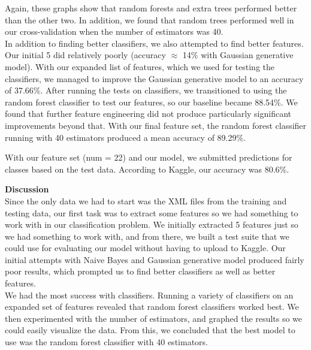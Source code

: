 \documentclass[12pt]{article}
\begin{document}
Again, these graphs show that random forests and extra trees performed better than the other two. In addition, we found that random trees performed well in our cross-validation when the number of estimators was 40. \\

In addition to finding better classifiers, we also attempted to find better features. Our initial 5 did relatively poorly (accuracy $\approx$ 14\% with Gaussian generative model). With our expanded list of features, which we used for testing the classifiers, we managed to improve the Gaussian generative model to an accuracy of 37.66\%. After running the tests on classifiers, we transitioned to using the random forest classifier to test our features, so our baseline became 88.54\%. We found that further feature engineering did not produce particularly significant improvements beyond that. With our final feature set, the random forest classifier running with 40 estimators produced a mean accuracy of 89.29\%. 

With our feature set (num = 22) and our model, we submitted predictions for classes based on the test data. According to Kaggle, our accuracy was 80.6\%.

\bigskip

\textbf{Discussion} \\
Since the only data we had to start was the XML files from the training and testing data, our first task was to extract some features so we had something to work with in our classification problem. We initially extracted 5 features just so we had something to work with, and from there, we built a test suite that we could use for evaluating our model without having to upload to Kaggle. Our initial attempts with Naive Bayes and Gaussian generative model produced fairly poor results, which prompted us to find better classifiers as well as better features. \\

We had the most success with classifiers. Running a variety of classifiers on an expanded set of features revealed that random forest classifiers worked best. We then experimented with the number of estimators, and graphed the results so we could easily visualize the data. From this, we concluded that the best model to use was the random forest classifier with 40 estimators.  \\
\end{document}
